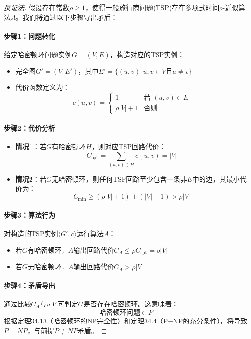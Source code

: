 \documentclass[./../main.tex]{subfiles} %
\begin{document}
\begin{proof}[反证法]
假设存在常数$\rho \geq 1$，使得一般旅行商问题(TSP)存在多项式时间$\rho$-近似算法$A$。我们将通过以下步骤导出矛盾：

\paragraph{步骤1：问题转化}
给定哈密顿环问题实例$G=(V,E)$，构造对应的TSP实例：
\begin{itemize}
    \item 完全图$G'=(V,E')$，其中$E'=\{(u,v):u,v\in V \text{且} u\neq v\}$
    \item 代价函数定义为：
    $$
    c(u,v) = 
    \begin{cases}
    1 & \text{若 } (u,v)\in E \\
    \rho|V| + 1 & \text{否则}
    \end{cases}
    $$
\end{itemize}

\paragraph{步骤2：代价分析}
\begin{itemize}
    \item \textbf{情况1}：若$G$有哈密顿环$H$，则对应TSP回路代价：
    $$
    C_{\text{opt}} = \sum_{(u,v)\in H} c(u,v) = |V|
    $$
    
    \item \textbf{情况2}：若$G$无哈密顿环，则任何TSP回路至少包含一条非$E$中的边，其最小代价为：
    $$
    C_{\text{min}} \geq (\rho|V|+1) + (|V|-1) > \rho|V|
    $$
\end{itemize}

\paragraph{步骤3：算法行为}
对构造的TSP实例$\langle G',c\rangle$运行算法$A$：
\begin{itemize}
    \item 若$G$有哈密顿环，$A$输出回路代价$C_A \leq \rho C_{\text{opt}} = \rho|V|$
    \item 若$G$无哈密顿环，$A$输出回路代价$C_A > \rho|V|$
\end{itemize}

\paragraph{步骤4：矛盾导出}
通过比较$C_A$与$\rho|V|$可判定$G$是否存在哈密顿环。这意味着：
$$
\text{哈密顿环问题}\in P
$$
根据定理34.13（哈密顿环的NP完全性）和定理34.4（P=NP的充分条件），将导致$P=NP$，与前提$P\neq NP$矛盾。

\end{proof}
\end{document}
